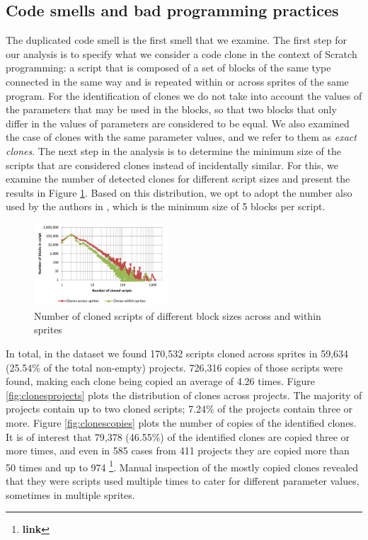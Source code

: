 \documentclass{sig-alternate}
\newcommand{\todo}[1]{\textbf{#1}}
\begin{document}
\subsection{Code smells and bad programming practices}

The duplicated code smell is the first smell that we examine. The first step for our analysis is to specify what we consider a code clone in the context of Scratch programming: a script that is composed of a set of blocks of the same type connected in the same way and is repeated within or across sprites of the same program. For the identification of clones we do not take into account the values of the parameters that may be used in the blocks, so that two blocks that only differ in the values of parameters are considered to be equal. We also examined the case of clones with the same parameter values, and we refer to them as \textit{exact clones}. The next step in the analysis is to determine the minimum size of the scripts that are considered clones instead of incidentally similar. For this, we examine the number of detected clones for different script sizes and present the results in Figure \ref{fig:cloneslines}. Based on this distribution, we opt to adopt the number also used by the authors in \cite{moreno_automatic_2014}, which is the minimum size of 5 blocks per script.

\begin{figure}
	\centering
	\includegraphics[width=0.45\textwidth]{fig/charts/11cloneslines}
	\caption{Number of cloned scripts of different block sizes across and within sprites}
	\label{fig:cloneslines}
\end{figure}

In total, in the dataset we found 170,532 scripts cloned across sprites in 59,634 (25.54\% of the total non-empty) projects. 726,316 copies of those scripts were found, making each clone being copied an average of 4.26 times. Figure \ref{fig:clonesprojects} plots the distribution of clones across projects. The majority of projects contain up to two cloned scripts; 7.24\% of the projects contain three or more. Figure \ref{fig:clonescopies} plots the number of copies of the identified clones. It is of interest that 79,378 (46.55\%) of the identified clones are copied three or more times, and even in 585 cases from 411 projects they are copied more than 50 times and up to 974 \footnote{\todo{link}}. Manual inspection of the mostly copied clones revealed that they were scripts used multiple times to cater for different parameter values, sometimes in multiple sprites.
\end{document}
